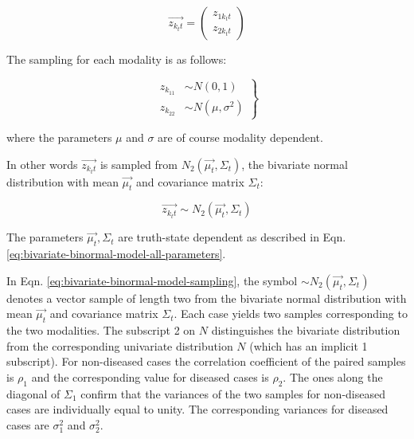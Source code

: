 \documentclass[
]{book}
\begin{document}
\begin{equation} 
\overrightarrow{z_{k_tt}}=
\left( \begin{matrix}
z_{1k_tt}  \\
z_{2k_tt}
\end{matrix} \right)
\label{eq:bivariate-binormal-model-notation}
\end{equation}

The sampling for each modality is as follows:

\begin{equation}
\left.\begin{aligned}
z_{k_11} &\sim  N\left( 0, 1 \right) \\
z_{k_22} &\sim  N\left( \mu, \sigma^2 \right)
\end{aligned}\right\}
\label{eq:univariate-binormal-model-sampling}
\end{equation}

where the parameters \(\mu\) and \(\sigma\) are of course modality dependent.

In other words \(\overrightarrow{z_{k_tt}}\) is sampled from \(N_2\left( \overrightarrow{\mu_t}, \Sigma_t \right)\), the bivariate normal distribution with mean \(\overrightarrow{\mu_t}\) and covariance matrix \(\Sigma_t\):

\begin{equation}
\overrightarrow{z_{k_tt}} \sim  N_2\left( \overrightarrow{\mu_t}, \Sigma_t \right)
\label{eq:bivariate-binormal-model-sampling}
\end{equation}

The parameters \(\overrightarrow{\mu_t}, \Sigma_t\) are truth-state dependent as described in Eqn. \eqref{eq:bivariate-binormal-model-all-parameters}.

In Eqn. \eqref{eq:bivariate-binormal-model-sampling}, the symbol \(\sim N_2\left( \overrightarrow{\mu_t}, \Sigma_t \right)\) denotes a vector sample of length two from the bivariate normal distribution with mean \(\overrightarrow{\mu_t}\) and covariance matrix \(\Sigma_t\). Each case yields two samples corresponding to the two modalities. The subscript 2 on \(N\) distinguishes the bivariate distribution from the corresponding univariate distribution \(N\) (which has an implicit 1 subscript). For non-diseased cases the correlation coefficient of the paired samples is \(\rho_1\) and the corresponding value for diseased cases is \(\rho_2\). The ones along the diagonal of \(\Sigma_1\) confirm that the variances of the two samples for non-diseased cases are individually equal to unity. The corresponding variances for diseased cases are \(\sigma_1^2\) and \(\sigma_2^2\).
\end{document}
